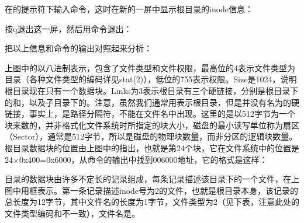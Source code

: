 在的提示符下输入命令，这时在新的一屏中显示根目录的inode信息：




按q退出这一屏，然后用命令退出：




把以上信息和命令的输出对照起来分析：




上图中的以八进制表示，包含了文件类型和文件权限，最高位的4表示文件类型为目录（各种文件类型的编码详见stat(2)），低位的755表示权限。Size是1024，说明根目录现在只有一个数据块。Links为3表示根目录有三个硬链接，分别是根目录下的和，以及子目录下的。注意，虽然我们通常用\BookCode{/\BookSplit{}}表示根目录，但是并没有名为\BookCode{/\BookSplit{}}的硬链接，事实上，\BookCode{/\BookSplit{}}是路径分隔符，不能在文件名中出现。这里的是以512字节为一个块来数的，并非格式化文件系统时所指定的块大小，磁盘的最小读写单位称为扇区（Sector），通常是512字节，所以是磁盘的物理块数量，而非分区的逻辑块数量。根目录数据块的位置由上图中的指出，也就是第24个块，它在文件系统中的位置是24×\BookSplit{}0x400=\BookSplit{}0x6000，从命令的输出中找到006000地址，它的格式是这样：




目录的数据块由许多不定长的记录组成，每条记录描述该目录下的一个文件，在上图中用框表示。第一条记录描述inode号为2的文件，也就是根目录本身，该记录的总长度为12字节，其中文件名的长度为1字节，文件类型为2（见下表，注意此处的文件类型编码和不一致），文件名是。


